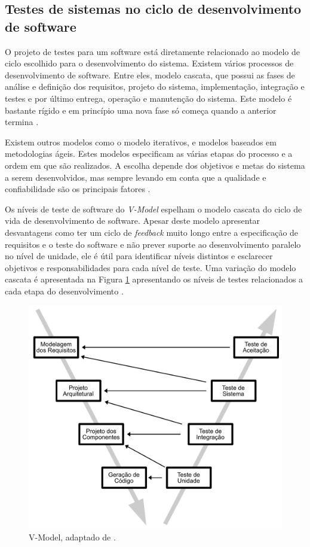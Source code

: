 \subsection{Testes de sistemas no ciclo de desenvolvimento de software}

O projeto de testes para um software está diretamente relacionado ao modelo de ciclo escolhido para o desenvolvimento do sistema. Existem vários processos de desenvolvimento de software. Entre eles, modelo cascata, que possui as fases de análise e definição dos requisitos, projeto do sistema, implementação, integração e testes e por último entrega, operação e manutenção do sistema. Este modelo é bastante rígido e em princípio uma nova fase só começa quando a anterior termina \cite{sommerville2010}.

Existem outros modelos como o modelo iterativos, e modelos baseados em metodologias ágeis. Estes modelos especificam as várias etapas do processo e a ordem em que são realizados. A escolha  depende dos objetivos e metas do sistema a serem desenvolvidos, mas sempre levando em conta que a qualidade e confiabilidade são os principais fatores \cite{graham2008foundations}.

Os níveis de teste de software do \textit{V-Model} espelham o modelo cascata do ciclo de vida de desenvolvimento de software. Apesar deste modelo apresentar desvantagens como ter um ciclo de \textit{feedback} muito longo entre a especificação de requisitos e o teste do software e não prever suporte ao desenvolvimento paralelo no nível de unidade, ele é útil para identificar níveis distintos e esclarecer objetivos e responsabilidades para cada nível de teste. Uma variação do modelo cascata é apresentada na Figura \ref{fig:v-model} apresentando os níveis de testes relacionados a cada etapa do desenvolvimento \cite{jorgensen2016software}. 

\begin{figure}[ht]
\centering
\includegraphics[scale=0.6]{imagens/v-model.pdf}
\caption{V-Model, adaptado de \cite{pressman2005software}.}
\label{fig:v-model}
\end{figure}


